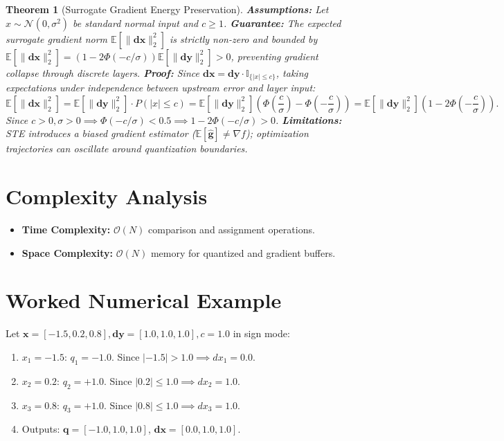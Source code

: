 \documentclass[11pt]{article}
\newtheorem{theorem}{Theorem}
\begin{document}
\begin{theorem}[Surrogate Gradient Energy Preservation]
\label{thm:ste_energy}
\textbf{Assumptions:} Let $x \sim \mathcal{N}(0, \sigma^2)$ be standard normal input and $c \ge 1$.
\textbf{Guarantee:} The expected surrogate gradient norm $\mathbb{E}[\|\mathbf{dx}\|_2^2]$ is strictly non-zero and bounded by $\mathbb{E}[\|\mathbf{dx}\|_2^2] = (1 - 2\Phi(-c/\sigma)) \mathbb{E}[\|\mathbf{dy}\|_2^2] > 0$, preventing gradient collapse through discrete layers.
\textbf{Proof:}
Since $\mathbf{dx} = \mathbf{dy} \cdot \mathbb{I}_{\{|x| \le c\}}$, taking expectations under independence between upstream error and layer input:
\begin{equation}
\mathbb{E}[\|\mathbf{dx}\|_2^2] = \mathbb{E}[\|\mathbf{dy}\|_2^2] \cdot P(|x| \le c) = \mathbb{E}[\|\mathbf{dy}\|_2^2] \left( \Phi\left(\frac{c}{\sigma}\right) - \Phi\left(-\frac{c}{\sigma}\right) \right) = \mathbb{E}[\|\mathbf{dy}\|_2^2] \left( 1 - 2\Phi\left(-\frac{c}{\sigma}\right) \right).
\end{equation}
Since $c > 0, \sigma > 0 \implies \Phi(-c/\sigma) < 0.5 \implies 1 - 2\Phi(-c/\sigma) > 0$.
\textbf{Limitations:} STE introduces a biased gradient estimator ($\mathbb{E}[\hat{\mathbf{g}}] \neq \nabla f$); optimization trajectories can oscillate around quantization boundaries.
\end{theorem}

\section{Complexity Analysis}
\label{sec:complexity}

\begin{itemize}
    \item \textbf{Time Complexity:} $\mathcal{O}(N)$ comparison and assignment operations.
    \item \textbf{Space Complexity:} $\mathcal{O}(N)$ memory for quantized and gradient buffers.
\end{itemize}

\section{Worked Numerical Example}
\label{sec:worked_example}

Let $\mathbf{x} = [-1.5, 0.2, 0.8], \mathbf{dy} = [1.0, 1.0, 1.0], c = 1.0$ in sign mode:
\begin{enumerate}
    \item $x_1 = -1.5$: $q_1 = -1.0$. Since $|-1.5| > 1.0 \implies dx_1 = 0.0$.
    \item $x_2 = 0.2$: $q_2 = +1.0$. Since $|0.2| \le 1.0 \implies dx_2 = 1.0$.
    \item $x_3 = 0.8$: $q_3 = +1.0$. Since $|0.8| \le 1.0 \implies dx_3 = 1.0$.
    \item Outputs: $\mathbf{q} = [-1.0, 1.0, 1.0]$, $\mathbf{dx} = [0.0, 1.0, 1.0]$.
\end{enumerate}
\end{document}
